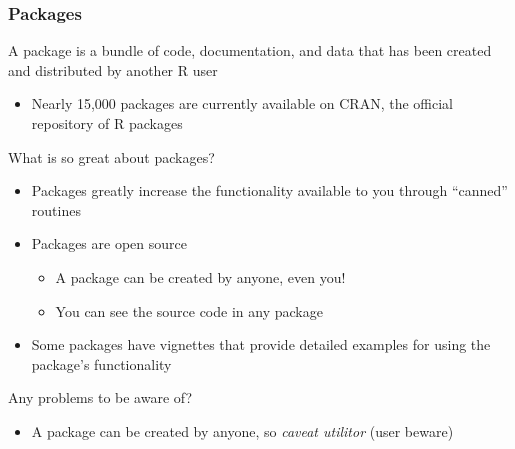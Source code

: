 \documentclass{beamer}\usepackage[]{graphicx}\usepackage[]{color}
\begin{document}
\begin{frame}\frametitle{Packages}
    A package is a bundle of code, documentation, and data that has been created and distributed by another R user
    \begin{itemize}
        \item Nearly 15,000 packages are currently available on CRAN, the official repository of R packages 
    \end{itemize}
    \vspace{2ex}
    What is so great about packages?
    \begin{itemize}
        \item Packages greatly increase the functionality available to you through ``canned'' routines
        \item Packages are open source
        \begin{itemize}
            \item A package can be created by anyone, even you!
            \item You can see the source code in any package
        \end{itemize}
        \item Some packages have vignettes that provide detailed examples for using the package's functionality
    \end{itemize}
    \vspace{2ex}
    Any problems to be aware of?
    \begin{itemize}
        \item A package can be created by anyone, so \emph{caveat utilitor} (user beware)
    \end{itemize}
\end{frame}
\end{document}
